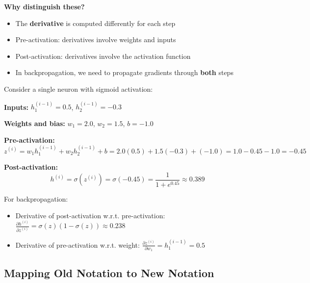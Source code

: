 \begin{notechapter}
\begin{center}
\end{center}

\textbf{Why distinguish these?}
\begin{itemize}
    \item The \textbf{derivative} is computed differently for each step
    \item Pre-activation: derivatives involve weights and inputs
    \item Post-activation: derivatives involve the activation function
    \item In backpropagation, we need to propagate gradients through \textbf{both} steps
\end{itemize}

\begin{example}
Consider a single neuron with sigmoid activation:

\textbf{Inputs:} $h_1^{(i-1)} = 0.5$, $h_2^{(i-1)} = -0.3$

\textbf{Weights and bias:} $w_1 = 2.0$, $w_2 = 1.5$, $b = -1.0$

\textbf{Pre-activation:}
$$z^{(i)} = w_1 h_1^{(i-1)} + w_2 h_2^{(i-1)} + b = 2.0(0.5) + 1.5(-0.3) + (-1.0) = 1.0 - 0.45 - 1.0 = -0.45$$

\textbf{Post-activation:}
$$h^{(i)} = \sigma(z^{(i)}) = \sigma(-0.45) = \frac{1}{1 + e^{0.45}} \approx 0.389$$

For backpropagation:
\begin{itemize}
    \item Derivative of post-activation w.r.t. pre-activation: $\frac{\partial h^{(i)}}{\partial z^{(i)}} = \sigma(z)(1-\sigma(z)) \approx 0.238$
    \item Derivative of pre-activation w.r.t. weight: $\frac{\partial z^{(i)}}{\partial w_1} = h_1^{(i-1)} = 0.5$
\end{itemize}
\end{example}

\subsection{Mapping Old Notation to New Notation}


\end{notechapter}
